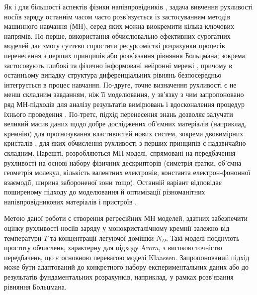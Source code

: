 \documentclass[fleqn,twoside,twocolumn,nofootinbib,showkeys]{revtex4} %
\begin{document}
Як і для більшості аспектів фізики напівпровідників \cite{Liu2022a}, задача вивчення рухливості носіїв заряду
останнім часом часто розв’язується із застосуванням методів машинного навчання (МН),
серед яких можна виокремити кілька ключових напрямів.
По-перше, використання обчислювально ефективних сурогатних моделей дає змогу суттєво спростити ресурсомісткі розрахунки
процесів перенесення з перших принципів або розв’язання рівняння Больцмана;
зокрема застосовують глибокі \cite{Li2020} та фізично інформовані нейронні мережі \cite{Li2023a,Li2024b}, причому в останньому випадку структура
диференціальних рівнянь безпосередньо інтегрується в процес навчання.
По-друге, точне визначення рухливості є не менш складним завданням, ніж її моделювання,
у зв’язку з чим запропоновано ряд МН-підходів для аналізу результатів вимірювань \cite{Fai2022} і вдосконалення процедур їхнього проведення \cite{Xu2022}.
По-третє, підхід перенесення знань дозволяє залучати великий масив даних щодо добре досліджених об’ємних матеріалів
(наприклад, кремнію) для прогнозування властивостей нових систем, зокрема двовимірних кристалів \cite{Chen2024},
для яких обчислення рухливості з перших принципів є надзвичайно складним.
Нарешті, розробляються МН-моделі, спрямовані на передбачення рухливості \cite{Hong2026,Nematiaram2025,Reiser2021,Pimachev2021,Bhat2024,Tan2023} на основі набору фізичних дескрипторів
(симетрія ґратки, об’ємна геометрія молекул, кількість валентних електронів, константа електрон-фононної взаємодії,
ширина забороненої зони тощо).
Останній варіант відповідає поширеному підходу до моделювання й оптимізації різноманітних напівпровідникових матеріалів і пристроїв \cite{Mamun2025, Raut2025,Khatua2024}.


Метою даної роботи є створення регресійних МН моделей, здатних забезпечити оцінку рухливості носіїв заряду у монокристалічному кремнії
залежно від температури $T$ та концентрації легуючої домішки $N_D$.
Такі моделі поєднують простоту обчислень, характерну для підходу Arora, з високою точністю передбачень, що є основною перевагою моделі Klaassen.
Запропонований підхід може бути адаптований до конкретного набору експериментальних даних або до результатів фундаментальних розрахунків,
наприклад, у рамках розв’язання рівняння Больцмана.
\end{document}
